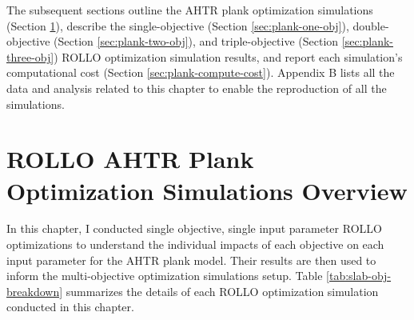 The subsequent sections outline the \gls{AHTR} plank optimization simulations 
(Section \ref{sec:plank-overview}), describe the single-objective (Section 
\ref{sec:plank-one-obj}), double-objective (Section \ref{sec:plank-two-obj}), and 
triple-objective (Section \ref{sec:plank-three-obj}) \gls{ROLLO} optimization 
simulation results, and report each simulation's computational cost 
(Section \ref{sec:plank-compute-cost}).
Appendix B lists all the data and analysis related to this chapter to enable the 
reproduction of all the simulations.

\section{ROLLO AHTR Plank Optimization Simulations Overview}
\label{sec:plank-overview}
In this chapter, I conducted single objective, single input parameter 
\gls{ROLLO} optimizations to understand the individual impacts of each objective on 
each input parameter for the \gls{AHTR} plank model. 
Their results are then used to inform the multi-objective optimization simulations setup. 
Table \ref{tab:slab-obj-breakdown} summarizes the details of each \gls{ROLLO} 
optimization simulation conducted in this chapter.
